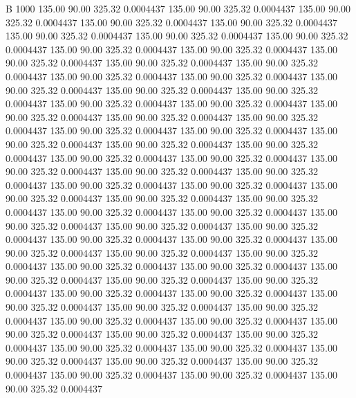 


B 1000
 135.00   90.00  325.32   0.0004437
 135.00   90.00  325.32   0.0004437
 135.00   90.00  325.32   0.0004437
 135.00   90.00  325.32   0.0004437
 135.00   90.00  325.32   0.0004437
 135.00   90.00  325.32   0.0004437
 135.00   90.00  325.32   0.0004437
 135.00   90.00  325.32   0.0004437
 135.00   90.00  325.32   0.0004437
 135.00   90.00  325.32   0.0004437
 135.00   90.00  325.32   0.0004437
 135.00   90.00  325.32   0.0004437
 135.00   90.00  325.32   0.0004437
 135.00   90.00  325.32   0.0004437
 135.00   90.00  325.32   0.0004437
 135.00   90.00  325.32   0.0004437
 135.00   90.00  325.32   0.0004437
 135.00   90.00  325.32   0.0004437
 135.00   90.00  325.32   0.0004437
 135.00   90.00  325.32   0.0004437
 135.00   90.00  325.32   0.0004437
 135.00   90.00  325.32   0.0004437
 135.00   90.00  325.32   0.0004437
 135.00   90.00  325.32   0.0004437
 135.00   90.00  325.32   0.0004437
 135.00   90.00  325.32   0.0004437
 135.00   90.00  325.32   0.0004437
 135.00   90.00  325.32   0.0004437
 135.00   90.00  325.32   0.0004437
 135.00   90.00  325.32   0.0004437
 135.00   90.00  325.32   0.0004437
 135.00   90.00  325.32   0.0004437
 135.00   90.00  325.32   0.0004437
 135.00   90.00  325.32   0.0004437
 135.00   90.00  325.32   0.0004437
 135.00   90.00  325.32   0.0004437
 135.00   90.00  325.32   0.0004437
 135.00   90.00  325.32   0.0004437
 135.00   90.00  325.32   0.0004437
 135.00   90.00  325.32   0.0004437
 135.00   90.00  325.32   0.0004437
 135.00   90.00  325.32   0.0004437
 135.00   90.00  325.32   0.0004437
 135.00   90.00  325.32   0.0004437
 135.00   90.00  325.32   0.0004437
 135.00   90.00  325.32   0.0004437
 135.00   90.00  325.32   0.0004437
 135.00   90.00  325.32   0.0004437
 135.00   90.00  325.32   0.0004437
 135.00   90.00  325.32   0.0004437
 135.00   90.00  325.32   0.0004437
 135.00   90.00  325.32   0.0004437
 135.00   90.00  325.32   0.0004437
 135.00   90.00  325.32   0.0004437
 135.00   90.00  325.32   0.0004437
 135.00   90.00  325.32   0.0004437
 135.00   90.00  325.32   0.0004437
 135.00   90.00  325.32   0.0004437
 135.00   90.00  325.32   0.0004437
 135.00   90.00  325.32   0.0004437
 135.00   90.00  325.32   0.0004437
 135.00   90.00  325.32   0.0004437
 135.00   90.00  325.32   0.0004437
 135.00   90.00  325.32   0.0004437
 135.00   90.00  325.32   0.0004437
 135.00   90.00  325.32   0.0004437
 135.00   90.00  325.32   0.0004437
 135.00   90.00  325.32   0.0004437
 135.00   90.00  325.32   0.0004437
 135.00   90.00  325.32   0.0004437
 135.00   90.00  325.32   0.0004437
